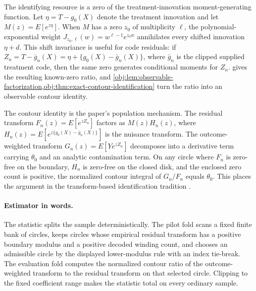 \documentclass[11pt]{article}
\begin{document}
The identifying resource is a zero of the treatment-innovation moment-generating function. Let \(\eta=T-g_0(X)\) denote the treatment innovation and let \(M(z)=E[e^{z\eta}]\). When \(M\) has a zero \(z_0\) of multiplicity \(\ell\), the polynomial-exponential weight \(J_{z_0,\ell}(w)=w^{\ell-1}e^{z_0w}\) annihilates every shifted innovation \(\eta+d\). This shift invariance is useful for code residuals: if \(Z_n=T-\bar g_n(X)=\eta+\{g_0(X)-\bar g_n(X)\}\), where \(\bar g_n\) is the clipped supplied treatment code, then the same zero generates conditional moments for \(Z_n\).  gives the resulting known-zero ratio, and \cref{obj:lem:observable-factorization,obj:thm:exact-contour-identification} turn the ratio into an observable contour identity.

The contour identity is the paper's population mechanism. The residual transform \(F_n(z)=E[e^{zZ_n}]\) factors as \(M(z)H_n(z)\), where \(H_n(z)=E[e^{z\{g_0(X)-\bar g_n(X)\}}]\) is the nuisance transform. The outcome-weighted transform \(G_n(z)=E[Ye^{zZ_n}]\) decomposes into a derivative term carrying \(\theta_0\) and an analytic contamination term. On any circle where \(F_n\) is zero-free on the boundary, \(H_n\) is zero-free on the closed disk, and the enclosed zero count is positive, the normalized contour integral of \(G_n/F_n\) equals \(\theta_0\). This places the argument in the transform-based identification tradition \citep{FeuervergerMcDunnough1981,Singleton2001,ChackoViceira2003,CarrascoFlorensRenault2007,Carrasco2017,KaganLinnikRao1973,Mattner1992,DHaultfoeuille2011,DarollesFanFlorensRenault2011,HuShiu2022}.

\paragraph{Estimator in words.}
The statistic splits the sample deterministically. The pilot fold scans a fixed finite bank of circles, keeps circles whose empirical residual transform has a positive boundary modulus and a positive decoded winding count, and chooses an admissible circle by the displayed lower-modulus rule with an index tie-break. The evaluation fold computes the normalized contour ratio of the outcome-weighted transform to the residual transform on that selected circle. Clipping to the fixed coefficient range makes the statistic total on every ordinary sample.
\end{document}
